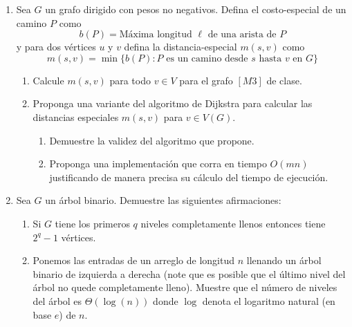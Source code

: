 \documentclass[12pt, a4paper]{article}
\begin{document}
\begin{enumerate}
\item Sea $G$ un grafo dirigido con pesos no negativos. Defina el costo-especial de un camino $P$ como 
\[b(P)=\text{M\'axima longitud $\ell$ de una arista de $P$}\]
y para dos v\'ertices $u$ y $v$ defina la distancia-especial $m(s,v)$ como
\[m(s,v)=\min\{b(P): \text{$P$ es un camino desde $s$ hasta $v$ en $G$}\}\]
\begin{enumerate}
\item Calcule $m(s,v)$ para todo $v\in V$ para el grafo $[M3]$ de clase.
\item Proponga una variante del algoritmo de Dijkstra para calcular las distancias especiales $m(s,v)$ para $v\in V(G)$.
\begin{enumerate}
\item Demuestre la validez del algoritmo que propone.
\item Proponga una implementación que corra en tiempo $O(mn)$ justificando de manera precisa su cálculo del tiempo de ejecución.
\end{enumerate}
\end{enumerate}


\item Sea $G$ un \'arbol binario. Demuestre las siguientes afirmaciones:
\begin{enumerate}
\item Si $G$ tiene los primeros $q$ niveles completamente llenos entonces tiene $2^{q}-1$ v\'ertices.
\item Ponemos las entradas de un arreglo de longitud $n$ llenando un \'arbol binario  de izquierda a derecha (note que es posible que el último nivel del \'arbol no quede completamente lleno). Muestre que el número de niveles del \'arbol es $\Theta(\log(n))$ donde $\log$ denota el logaritmo natural (en base $e$) de $n$.
\end{enumerate} 

\end{enumerate}
\end{document}
